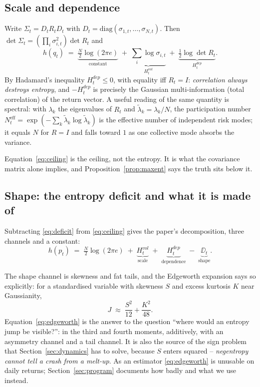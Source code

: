 \subsection{Scale and dependence}

Write $\Sigma_t = D_tR_tD_t$ with $D_t=\mathrm{diag}(\sigma_{1,t},\dots,\sigma_{N,t})$.
Then $\det\Sigma_t = \left(\prod_i\sigma_{i,t}^2\right)\det R_t$ and
\begin{equation}
\label{eq:ceiling}
h(q_t) \;=\; \underbrace{\tfrac{N}{2}\log(2\pi e)}_{\text{constant}}
\;+\; \underbrace{\sum_i \log\sigma_{i,t}}_{H^{vol}_t}
\;+\; \underbrace{\tfrac12\log\det R_t}_{H^{dep}_t}.
\end{equation}
By Hadamard's inequality $H^{dep}_t\le 0$, with equality iff $R_t=I$:
\emph{correlation always destroys entropy}, and $-H^{dep}_t$ is precisely the
Gaussian multi-information (total correlation) of the return vector. A useful
reading of the same quantity is spectral: with $\lambda_k$ the eigenvalues of
$R_t$ and $\tilde\lambda_k=\lambda_k/N$, the participation number
$N^{\text{eff}}_t=\exp\!\left(-\sum_k\tilde\lambda_k\log\tilde\lambda_k\right)$
is the effective number of independent risk modes; it equals $N$ for $R=I$ and
falls toward $1$ as one collective mode absorbs the variance.

Equation~\eqref{eq:ceiling} is the ceiling, not the entropy. It is what the
covariance matrix alone implies, and Proposition~\ref{prop:maxent} says the
truth sits below it.

\subsection{Shape: the entropy deficit and what it is made of}

Subtracting \eqref{eq:deficit} from \eqref{eq:ceiling} gives the paper's
decomposition, three channels and a constant:
\begin{equation}
\label{eq:three}
h(p_t) \;=\; \tfrac{N}{2}\log(2\pi e) \;+\; \underbrace{H^{vol}_t}_{\text{scale}} \;+\; \underbrace{H^{dep}_t}_{\text{dependence}} \;-\; \underbrace{\DD_t}_{\text{shape}}.
\end{equation}

The shape channel is skewness and fat tails, and the Edgeworth expansion says so
explicitly: for a standardised variable with skewness $S$ and excess kurtosis
$K$ near Gaussianity,
\begin{equation}
\label{eq:edgeworth}
J \;\approx\; \frac{S^2}{12} + \frac{K^2}{48}.
\end{equation}
Equation~\eqref{eq:edgeworth} is the answer to the question ``where would an
entropy jump be visible?'': in the third and fourth moments, additively, with an
asymmetry channel and a tail channel. It is also the source of the sign problem
that Section~\ref{sec:dynamics} has to solve, because $S$ enters squared --
\emph{negentropy cannot tell a crash from a melt-up}. As an estimator
\eqref{eq:edgeworth} is unusable on daily returns; Section~\ref{sec:program}
documents how badly and what we use instead.

